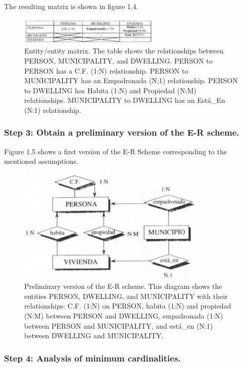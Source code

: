\documentclass{article}
\numberwithin{figure}{section}
\begin{document}
The resulting matrix is shown in figure 1.4.

\begin{figure}
    \centering
    \includegraphics[width=0.6\textwidth]{figures/fig4}
    \caption{Entity/entity matrix. The table shows the relationships between PERSON, MUNICIPALITY, and DWELLING. PERSON to PERSON has a C.F. (1:N) relationship. PERSON to MUNICIPALITY has an Empadronada (N:1) relationship. PERSON to DWELLING has Habita (1:N) and Propiedad (N:M) relationships. MUNICIPALITY to DWELLING has an Está\_En (N:1) relationship.}
    \label{fig:fig1.4}
\end{figure}

\subsubsection*{Step 3: Obtain a preliminary version of the E-R scheme.}

Figure 1.5 shows a first version of the E-R Scheme corresponding to the mentioned assumptions.

\begin{figure}
    \centering
    \includegraphics[width=0.8\textwidth]{figures/fig5}
    \caption{Preliminary version of the E-R scheme. This diagram shows the entities PERSON, DWELLING, and MUNICIPALITY with their relationships: C.F. (1:N) on PERSON, habita (1:N) and propiedad (N:M) between PERSON and DWELLING, empadronada (1:N) between PERSON and MUNICIPALITY, and está\_en (N:1) between DWELLING and MUNICIPALITY.}
    \label{fig:fig1.5}
\end{figure}

\subsubsection*{Step 4: Analysis of minimum cardinalities.}
\end{document}
